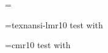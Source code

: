 



\pdfinterwordspaceon
\footline={}




\font\fa=texnansi-lmr10\fa
test with \fontname\fa

\font\fb=cmr10\fb
test with \fontname\fb


\bye

